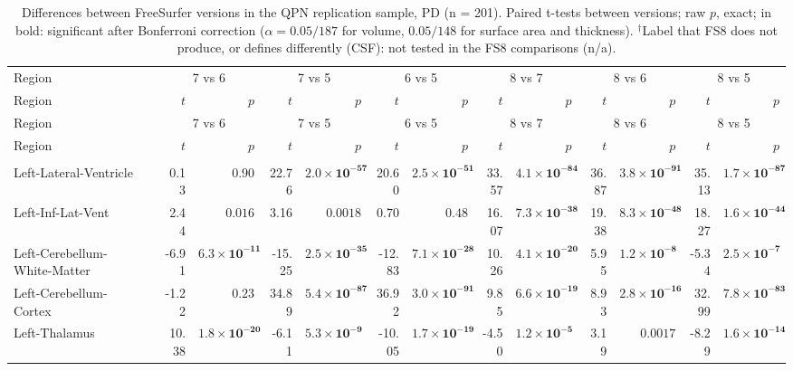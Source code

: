 {\scriptsize\setlength{\tabcolsep}{3pt}
\begin{longtable}{llrrrrrrrrrrrr}
\caption{Differences between FreeSurfer versions in the QPN replication sample, PD (n = 201). Paired t-tests between versions; raw $p$, exact; in bold: significant after Bonferroni correction ($\alpha = 0.05/187$ for volume, $0.05/148$ for surface area and thickness). $^{\dagger}$Label that FS8 does not produce, or defines differently (CSF): not tested in the FS8 comparisons (n/a).}\label{tab:S6}\\
\toprule
Region & & \multicolumn{2}{c}{7 vs 6} & \multicolumn{2}{c}{7 vs 5} & \multicolumn{2}{c}{6 vs 5} & \multicolumn{2}{c}{8 vs 7} & \multicolumn{2}{c}{8 vs 6} & \multicolumn{2}{c}{8 vs 5} \\
Region & & $t$ & $p$ & $t$ & $p$ & $t$ & $p$ & $t$ & $p$ & $t$ & $p$ & $t$ & $p$ \\
\midrule\endfirsthead
\toprule
Region & & \multicolumn{2}{c}{7 vs 6} & \multicolumn{2}{c}{7 vs 5} & \multicolumn{2}{c}{6 vs 5} & \multicolumn{2}{c}{8 vs 7} & \multicolumn{2}{c}{8 vs 6} & \multicolumn{2}{c}{8 vs 5} \\
Region & & $t$ & $p$ & $t$ & $p$ & $t$ & $p$ & $t$ & $p$ & $t$ & $p$ & $t$ & $p$ \\
\midrule\endhead
\bottomrule\endfoot
\midrule\multicolumn{14}{l}{\textbf{Volume (subcortical)}} \\
Left-Lateral-Ventricle &  & 0.13 & $0.90$ & 22.76 & $\mathbf{2.0{\times}10^{-57}}$ & 20.60 & $\mathbf{2.5{\times}10^{-51}}$ & 33.57 & $\mathbf{4.1{\times}10^{-84}}$ & 36.87 & $\mathbf{3.8{\times}10^{-91}}$ & 35.13 & $\mathbf{1.7{\times}10^{-87}}$ \\
Left-Inf-Lat-Vent &  & 2.44 & $0.016$ & 3.16 & $0.0018$ & 0.70 & $0.48$ & 16.07 & $\mathbf{7.3{\times}10^{-38}}$ & 19.38 & $\mathbf{8.3{\times}10^{-48}}$ & 18.27 & $\mathbf{1.6{\times}10^{-44}}$ \\
Left-Cerebellum-White-Matter &  & -6.91 & $\mathbf{6.3{\times}10^{-11}}$ & -15.25 & $\mathbf{2.5{\times}10^{-35}}$ & -12.83 & $\mathbf{7.1{\times}10^{-28}}$ & 10.26 & $\mathbf{4.1{\times}10^{-20}}$ & 5.95 & $\mathbf{1.2{\times}10^{-8}}$ & -5.34 & $\mathbf{2.5{\times}10^{-7}}$ \\
Left-Cerebellum-Cortex &  & -1.22 & $0.23$ & 34.89 & $\mathbf{5.4{\times}10^{-87}}$ & 36.92 & $\mathbf{3.0{\times}10^{-91}}$ & 9.85 & $\mathbf{6.6{\times}10^{-19}}$ & 8.93 & $\mathbf{2.8{\times}10^{-16}}$ & 32.99 & $\mathbf{7.8{\times}10^{-83}}$ \\
Left-Thalamus &  & 10.38 & $\mathbf{1.8{\times}10^{-20}}$ & -6.11 & $\mathbf{5.3{\times}10^{-9}}$ & -10.05 & $\mathbf{1.7{\times}10^{-19}}$ & -4.50 & $\mathbf{1.2{\times}10^{-5}}$ & 3.19 & $0.0017$ & -8.29 & $\mathbf{1.6{\times}10^{-14}}$ \\

\end{longtable}}

